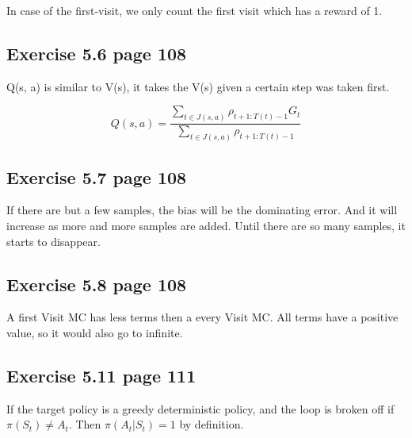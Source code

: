 In case of the first-visit, we only count the first visit which has a reward of 1.

\subsection{Exercise 5.6 page 108}
Q(s, a) is similar to V(s), it takes the V(s) given a certain step was taken first.

\begin{equation}
Q(s, a) = \frac{\sum_{t \in J(s,a)} \rho_{t+1:T(t)-1} G_t }{\sum_{t \in J(s,a)} \rho_{t+1:T(t)-1}}
\end{equation}

\subsection{Exercise 5.7 page 108}
If there are but a few samples, the bias will be the dominating error. And it will increase as more and more samples are added. Until there are so many samples, it starts to disappear.

\subsection{Exercise 5.8 page 108}
A first Visit MC has less terms then a every Visit MC. All terms have a positive value, so it would also go to infinite.

\subsection{Exercise 5.11 page 111}
If the target policy is a greedy deterministic policy, and the loop is broken off if $\pi (S_t) \neq A_t$. Then $\pi(A_t|S_t)=1$ by definition.  